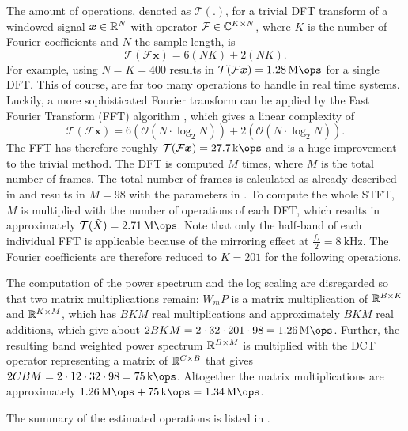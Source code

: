 The amount of operations, denoted as $\mathcal{T(.)}$, for a trivial DFT transform of a windowed signal $\bm{x} \in \mathbb{R}^N$ with operator $\mathcal{F} \in \mathbb{C}^{K \times N}$, where $K$ is the number of Fourier coefficients and $N$ the sample length, is
\begin{equation}
  \mathcal{T}(\mathcal{F} \bm{x}) = 6 (N K) + 2 (N K).
\end{equation}
For example, using $N = K = 400$ results in $\mathcal{T}(\mathcal{F} \bm{x}) = \SI{1.28}{\mega\ops}$ for a single DFT.
This of course, are far too many operations to handle in real time systems.
Luckily, a more sophisticated Fourier transform can be applied by the Fast Fourier Transform (FFT) algorithm \cite{Brigham1967FFT}, which gives a linear complexity of
\begin{equation}
  \mathcal{T}(\mathcal{F} \bm{x}) = 6 (\mathcal{O}(N \cdot \log_2 N)) + 2 (\mathcal{O}(N \cdot \log_2 N)).
\end{equation}
The FFT has therefore roughly $\mathcal{T}(\mathcal{F} \bm{x}) = \SI{27.7}{\kilo\ops}$ and is a huge improvement to the trivial method.
The DFT is computed $M$ times, where $M$ is the total number of frames.
The total number of frames is calculated as already described in  and results in $M = 98$ with the parameters in .
To compute the whole STFT, $M$ is multiplied with the number of operations of each DFT, which results in approximately $\mathcal{T}(\tilde{X}) = \SI{2.71}{\mega\ops}$.
Note that only the half-band of each individual FFT is applicable because of the mirroring effect at $\frac{f_s}{2} = \SI{8}{\kilo\hertz}$.
The Fourier coefficients are therefore reduced to $K = 201$ for the following operations.

The computation of the power spectrum and the log scaling are disregarded so that two matrix multiplications remain:
$W_m P$ is a matrix multiplication of $\mathbb{R}^{B \times K}$ and $\mathbb{R}^{K \times M}$, which has $B K M$ real multiplications and approximately $B K M$ real additions, which give about $2 B K M = 2 \cdot 32 \cdot 201 \cdot 98 =  \SI{1.26}{\mega\ops}$.
Further, the resulting band weighted power spectrum $\mathbb{R}^{B \times M}$ is multiplied with the DCT operator representing a matrix of $\mathbb{R}^{C \times B}$ that gives $2 C B M = 2 \cdot 12 \cdot 32 \cdot 98 = \SI{75}{\kilo\ops}$.
Altogether the matrix multiplications are approximately $\SI{1.26}{\mega\ops} + \SI{75}{\kilo\ops} = \SI{1.34}{\mega\ops}$.

The summary of the estimated operations is listed in .



